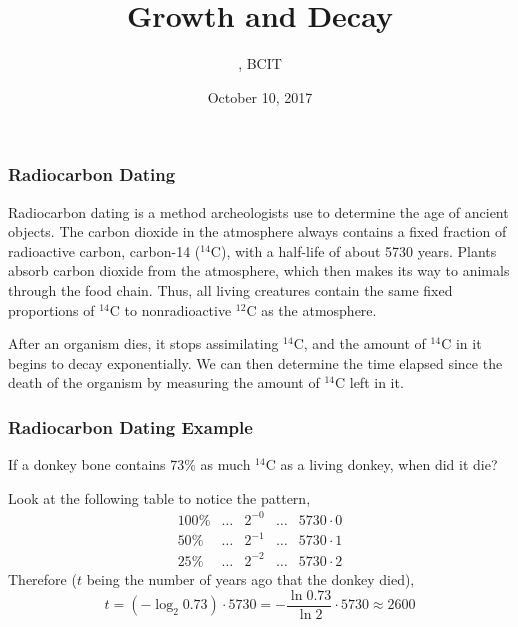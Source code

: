 \documentclass[xcolor=dvipsnames]{beamer}
\title{Growth and Decay}
\subtitle{{\CourseNumber}, BCIT}
\author{\CourseName}
\date{October 10, 2017}
\begin{document}
\begin{frame}
  \titlepage
\end{frame}

\begin{frame}
  \frametitle{Radiocarbon Dating}
Radiocarbon dating is a method archeologists use to determine the age
of ancient objects. The carbon dioxide in the atmosphere always
contains a fixed fraction of radioactive carbon, carbon-14 ($^{14}$C),
with a half-life of about 5730 years. Plants absorb carbon dioxide
from the atmosphere, which then makes its way to animals through the
food chain. Thus, all living creatures contain the same fixed
proportions of $^{14}$C to nonradioactive $^{12}$C as the atmosphere.

\medskip

After an organism dies, it stops assimilating $^{14}$C, and the amount
of $^{14}$C in it begins to decay exponentially. We can then determine
the time elapsed since the death of the organism by measuring the
amount of $^{14}$C left in it.
\end{frame}

\begin{frame}
  \frametitle{Radiocarbon Dating Example}
If a donkey bone contains 73\% as much $^{14}$C as a living donkey,
when did it die?

\medskip

Look at the following table to notice the pattern,
\begin{equation}
  \label{eq:sayeeziu}
  \begin{array}{rcccl}
        100\% & \ldots & 2^{-0} & \ldots & 5730\cdot{}0 \\
        50\% & \ldots & 2^{-1} & \ldots & 5730\cdot{}1 \\
        25\% & \ldots & 2^{-2} & \ldots & 5730\cdot{}2
  \end{array}
\end{equation}
Therefore ($t$ being the number of years ago that the donkey died),
\begin{equation}
  \label{eq:anuvuama}
  t=\left(-\log_{2}0.73\right)\cdot{}5730=-\frac{\ln{}0.73}{\ln{}2}\cdot{}5730\approx{}2600
\end{equation}
\end{frame}
\end{document}
